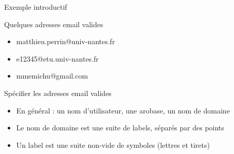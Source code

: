
\begingroup

\begin{frame}{Exemple introductif}
  \begin{exampleblock}{Quelques adresses email valides}
    \begin{itemize}
    \item matthieu.perrin@univ-nantes.fr
    \item e12345@etu.univ-nantes.fr
    \item mmemichu@gmail.com
    \end{itemize}
  \end{exampleblock}

  \pause
  \begin{block}{Spécifier les adresses email valides}
    \begin{itemize}
    \item En général : un nom d'utilisateur, une arobase, un nom de domaine
      \vspace{-3mm}
    \item\vspace{-6mm} Le nom de domaine est une suite de labels, séparés par des points
      \vspace{-3mm}
    \item\vspace{-6mm} Un label est une suite non-vide de symboles (lettres et tirets)
      \vspace{-3mm}
    \end{itemize}
  \end{block}
\end{frame}


\endgroup
